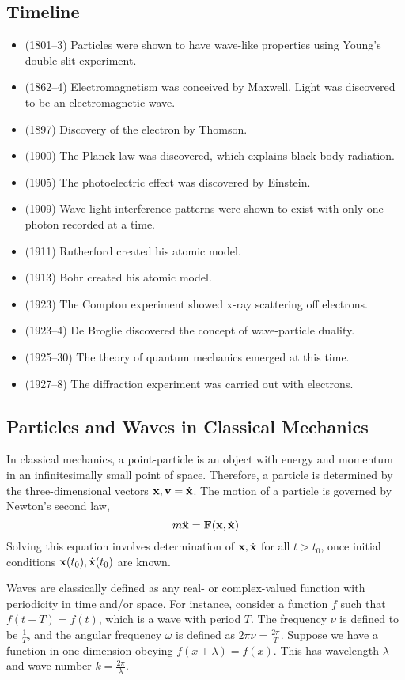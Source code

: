 \subsection{Timeline}
\begin{itemize}
    \item (1801--3) Particles were shown to have wave-like properties using Young's double slit experiment.
    \item (1862--4) Electromagnetism was conceived by Maxwell. Light was discovered to be an electromagnetic wave.
    \item (1897) Discovery of the electron by Thomson.
    \item (1900) The Planck law was discovered, which explains black-body radiation.
    \item (1905) The photoelectric effect was discovered by Einstein.
    \item (1909) Wave-light interference patterns were shown to exist with only one photon recorded at a time.
    \item (1911) Rutherford created his atomic model.
    \item (1913) Bohr created his atomic model.
    \item (1923) The Compton experiment showed x-ray scattering off electrons.
    \item (1923--4) De Broglie discovered the concept of wave-particle duality.
    \item (1925--30) The theory of quantum mechanics emerged at this time.
    \item (1927--8) The diffraction experiment was carried out with electrons.
\end{itemize}

\subsection{Particles and Waves in Classical Mechanics}
In classical mechanics, a point-particle is an object with energy and momentum in an infinitesimally small point of space.
Therefore, a particle is determined by the three-dimensional vectors \( \vb x, \vb v = \dot{\vb x} \).
The motion of a particle is governed by Newton's second law,
\[ m \ddot{\vb x} = \vb F(\vb x, \dot{\vb x}) \]
Solving this equation involves determination of \( \vb x, \dot{\vb x} \) for all \( t > t_0 \), once initial conditions \( \vb x(t_0), \dot{\vb x}(t_0) \) are known.

Waves are classically defined as any real- or complex-valued function with periodicity in time and/or space.
For instance, consider a function \( f \) such that \( f(t + T) = f(t) \), which is a wave with period \( T \).
The frequency \( \nu \) is defined to be \( \frac{1}{T} \), and the angular frequency \( \omega \) is defined as \( 2 \pi \nu = \frac{2\pi}{T} \).
Suppose we have a function in one dimension obeying \( f(x+\lambda) = f(x) \).
This has wavelength \( \lambda \) and wave number \( k = \frac{2\pi}{\lambda} \).

